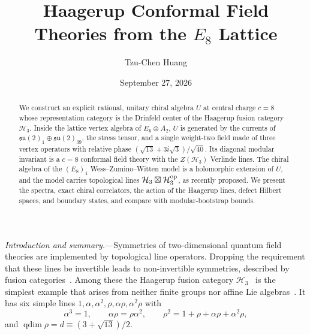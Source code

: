 \documentclass[aps,prl,twocolumn,superscriptaddress,nofootinbib]{revtex4-2}
\newcommand{\cH}{\mathcal H}
\newcommand{\su}{\mathfrak{su}}
\newcommand{\qdim}{\operatorname{qdim}}
\begin{document}
\title{Haagerup Conformal Field Theories from the $E_8$ Lattice}

\author{Tzu-Chen Huang}
\affiliation{[Affiliation]}

\date{September 27, 2026}

\begin{abstract}
We construct an explicit rational, unitary chiral algebra $U$ at central
charge $c=8$ whose representation category is the Drinfeld center of
the Haagerup fusion category $\cH_3$. Inside the lattice vertex algebra
of $E_6\oplus A_2$, $U$ is generated by the currents of
$\su(2)_1\oplus\su(2)_{39}$, the stress tensor, and a single weight-two
field made of three vertex operators with relative phase
$(\sqrt{13}+3i\sqrt3)/\sqrt{40}$. Its diagonal modular invariant is a
$c=8$ conformal field theory with the $Z(\cH_3)$ Verlinde lines. The
chiral algebra of the $(E_8)_1$ Wess--Zumino--Witten model is a
holomorphic extension of $U$, and the model carries topological lines
$\cH_3\boxtimes\cH_3^{\rm op}$, as recently proposed. We present the
spectra, exact chiral correlators, the action of the Haagerup lines,
defect Hilbert spaces, and boundary states, and compare with
modular-bootstrap bounds.
\end{abstract}

\maketitle

\textit{Introduction and summary.}---Symmetries of two-dimensional
quantum field theories are implemented by topological line operators.
Dropping the requirement that these lines be invertible leads to
non-invertible symmetries, described by fusion
categories~\cite{FRS,FFRS,BT,CLSWY}. Among these the Haagerup fusion
category $\cH_3$~\cite{Haagerup,AH,Izumi,GS} is the simplest example
that arises from neither finite groups nor affine Lie
algebras~\cite{note-exotic}. It has six simple lines
$1,\alpha,\alpha^2,\rho,\alpha\rho,\alpha^2\rho$ with
\begin{equation}
 \alpha^3=1,\qquad \alpha\rho=\rho\alpha^2,\qquad
 \rho^2=1+\rho+\alpha\rho+\alpha^2\rho,
 \label{eq:H3}
\end{equation}
and $\qdim\rho=d\equiv(3+\sqrt{13})/2$.
\end{document}
